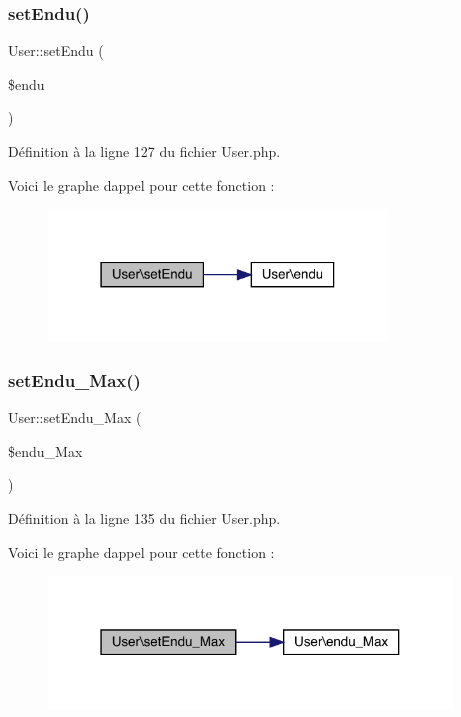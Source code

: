 \subsubsection{\texorpdfstring{set\+Endu()}{setEndu()}}
{\footnotesize\ttfamily User\+::set\+Endu (\begin{DoxyParamCaption}\item[{}]{\$endu }\end{DoxyParamCaption})}



Définition à la ligne 127 du fichier User.\+php.

Voici le graphe d\textquotesingle{}appel pour cette fonction \+:\nopagebreak
\begin{figure}[H]
\begin{center}
\leavevmode
\includegraphics[width=255pt]{class_user_a08df42bf36aae3eb166e208ad689c814_cgraph}
\end{center}
\end{figure}
\mbox{\label{class_user_a91e7269dbfaf44b1cd2266d892f01a5a}} 
\subsubsection{\texorpdfstring{set\+Endu\+\_\+\+Max()}{setEndu\_Max()}}
{\footnotesize\ttfamily User\+::set\+Endu\+\_\+\+Max (\begin{DoxyParamCaption}\item[{}]{\$endu\+\_\+\+Max }\end{DoxyParamCaption})}



Définition à la ligne 135 du fichier User.\+php.

Voici le graphe d\textquotesingle{}appel pour cette fonction \+:\nopagebreak
\begin{figure}[H]
\begin{center}
\leavevmode
\includegraphics[width=304pt]{class_user_a91e7269dbfaf44b1cd2266d892f01a5a_cgraph}
\end{center}
\end{figure}
\mbox{\label{class_user_ab72d9e4455c1813e3be5a8d422b2812d}} 
